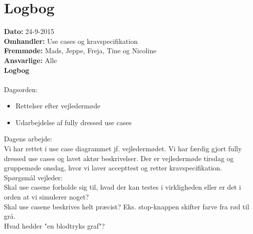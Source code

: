 \section{Logbog}

\textbf{Dato:} 24-9-2015 \\
\textbf{Omhandler:} Use cases og kravspecifikation\\
\textbf{Fremmøde:} Mads, Jeppe, Freja, Tine og Nicoline\\
\textbf{Ansvarlige:} Alle\\
\textbf{Logbog}
\\
\\
Dagsorden:
\begin{itemize}
	\item Rettelser efter vejledermøde
	\item Udarbejdelse af fully dressed use cases
\end{itemize}

Dagens arbejde: \\
Vi har rettet i use case diagrammet jf. vejledermødet. 
Vi har færdig gjort fully dressed use cases og lavet aktør beskrivelser.
Der er vejledermøde tirsdag og gruppemøde onsdag, hvor vi laver accepttest og retter kravspecifikation.\\


Spørgsmål vejleder: \\
Skal use casene forholde sig til, hvad der kan testes i virkligheden eller er det i orden at vi simulerer noget?\\
Skal use casene beskrives helt præcist? Eks. stop-knappen skifter farve fra rød til grå.\\
Hvad hedder "en blodtryks graf"?\\
